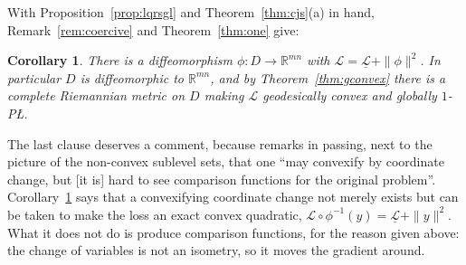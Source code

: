 \documentclass[11pt]{article}
\theoremstyle{plain}
\newtheorem{cor}[thm]{Corollary}
\theoremstyle{definition}
\theoremstyle{remark}
\newcommand{\R}{\mathbb{R}}
\begin{document}
With Proposition~\ref{prop:lqrsgl} and Theorem~\ref{thm:cjs}(a) in hand,
Remark~\ref{rem:coercive} and Theorem~\ref{thm:one} give:

\begin{cor}\label{cor:lqr}
There is a diffeomorphism $\phi\colon D\to\R^{mn}$ with
$\mathcal{L} = \underline{\mathcal{L}} + \|\phi\|^2$. In particular $D$ is
diffeomorphic to $\R^{mn}$, and by Theorem~\ref{thm:gconvex} there is a complete
Riemannian metric on $D$ making $\mathcal{L}$ geodesically convex and globally
$1$-P\L{}.
\end{cor}

The last clause deserves a comment, because \cite{Sontag2025L4DC} remarks in
passing, next to the picture of the non-convex sublevel sets, that one ``may
convexify by coordinate change, but [it is] hard to see comparison functions for
the original problem''. Corollary~\ref{cor:lqr} says that a convexifying
coordinate change not merely exists but can be taken to make the loss an exact
convex quadratic, $\mathcal{L}\circ\phi^{-1}(y) = \underline{\mathcal{L}}+\|y\|^2$.
What it does not do is produce comparison functions, for the reason given above:
the change of variables is not an isometry, so it moves the gradient around.
\end{document}
